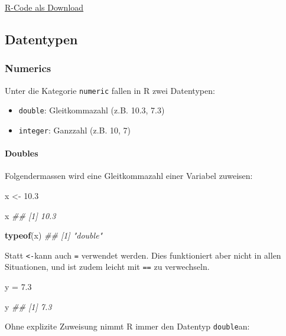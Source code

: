 \documentclass[]{book}
\newenvironment{Shaded}{\begin{snugshade}}{\end{snugshade}}
\newcommand{\CommentTok}[1]{\textcolor[rgb]{0.56,0.35,0.01}{\textit{#1}}}
\newcommand{\FloatTok}[1]{\textcolor[rgb]{0.00,0.00,0.81}{#1}}
\newcommand{\KeywordTok}[1]{\textcolor[rgb]{0.13,0.29,0.53}{\textbf{#1}}}
\newcommand{\NormalTok}[1]{#1}
\newcommand{\StringTok}[1]{\textcolor[rgb]{0.31,0.60,0.02}{#1}}
\providecommand{\tightlist}{%
  \setlength{\itemsep}{0pt}\setlength{\parskip}{0pt}}
\let\oldparagraph\paragraph
\renewcommand{\paragraph}[1]{\oldparagraph{#1}\mbox{}}
\begin{document}
\href{09_PrePro1/RFiles/Demo_Datentypen.R}{R-Code als Download}

\hypertarget{datentypen}{%
\subsection{Datentypen}\label{datentypen}}

\hypertarget{numerics}{%
\subsubsection{Numerics}\label{numerics}}

Unter die Kategorie \texttt{numeric} fallen in R zwei Datentypen:

\begin{itemize}
\tightlist
\item
  \texttt{double}: Gleitkommazahl (z.B. 10.3, 7.3)
\item
  \texttt{integer}: Ganzzahl (z.B. 10, 7)
\end{itemize}

\hypertarget{doubles}{%
\paragraph{Doubles}\label{doubles}}

Folgendermassen wird eine Gleitkommazahl einer Variabel zuweisen:

\begin{Shaded}
\begin{Highlighting}[]
\NormalTok{x <-}\StringTok{ }\FloatTok{10.3}

\NormalTok{x}
\CommentTok{## [1] 10.3}

\KeywordTok{typeof}\NormalTok{(x)}
\CommentTok{## [1] "double"}
\end{Highlighting}
\end{Shaded}

Statt \texttt{\textless{}-}kann auch \texttt{=} verwendet werden. Dies funktioniert aber nicht in allen Situationen, und ist zudem leicht mit \texttt{==} zu verwechseln.

\begin{Shaded}
\begin{Highlighting}[]
\NormalTok{y =}\StringTok{ }\FloatTok{7.3}

\NormalTok{y}
\CommentTok{## [1] 7.3}
\end{Highlighting}
\end{Shaded}

Ohne explizite Zuweisung nimmt R immer den Datentyp \texttt{double}an:
\end{document}
